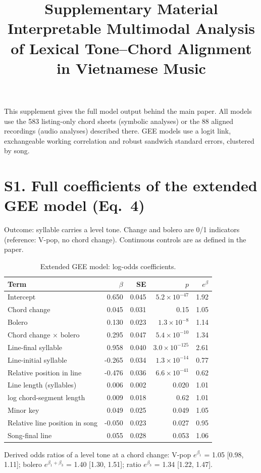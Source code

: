 \documentclass[11pt]{article}
\title{Supplementary Material\\[4pt]\large Interpretable Multimodal Analysis of Lexical Tone--Chord Alignment in Vietnamese Music}
\date{}
\begin{document}
\maketitle
\noindent This supplement gives the full model output behind the main paper. All models use the 583 listing-only chord sheets (symbolic analyses) or the 88 aligned recordings (audio analyses) described there. GEE models use a logit link, exchangeable working correlation and robust sandwich standard errors, clustered by song.
\renewcommand{\thetable}{S\arabic{table}}
\section*{S1. Full coefficients of the extended GEE model (Eq.~4)}
Outcome: syllable carries a level tone. Change and bolero are 0/1 indicators (reference: V-pop, no chord change). Continuous controls are as defined in the paper.
\begin{table}[H]\centering\caption{Extended GEE model: log-odds coefficients.}
\begin{tabular}{lrrrr}\toprule Term & $\beta$ & SE & $p$ & $e^{\beta}$\\\midrule
Intercept & 0.650 & 0.045 & $5.2\times10^{-47}$ & 1.92\\
Chord change & 0.045 & 0.031 & 0.15 & 1.05\\
Bolero & 0.130 & 0.023 & $1.3\times10^{-8}$ & 1.14\\
Chord change $\times$ bolero & 0.295 & 0.047 & $5.4\times10^{-10}$ & 1.34\\
Line-final syllable & 0.958 & 0.040 & $3.0\times10^{-125}$ & 2.61\\
Line-initial syllable & -0.265 & 0.034 & $1.3\times10^{-14}$ & 0.77\\
Relative position in line & -0.476 & 0.036 & $6.6\times10^{-41}$ & 0.62\\
Line length (syllables) & 0.006 & 0.002 & 0.020 & 1.01\\
log chord-segment length & 0.009 & 0.018 & 0.62 & 1.01\\
Minor key & 0.049 & 0.025 & 0.049 & 1.05\\
Relative line position in song & -0.050 & 0.023 & 0.027 & 0.95\\
Song-final line & 0.055 & 0.028 & 0.053 & 1.06\\
\bottomrule\end{tabular}\end{table}
Derived odds ratios of a level tone at a chord change: V-pop $e^{\beta_1}$ = 1.05 [0.98, 1.11]; bolero $e^{\beta_1+\beta_3}$ = 1.40 [1.30, 1.51]; ratio $e^{\beta_3}$ = 1.34 [1.22, 1.47].
\end{document}
